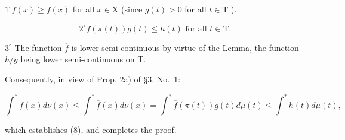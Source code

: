 \(1^{\circ}\overline{f} (x)\geqslant f(x)\) for all \(x\in \mathrm{X}\) (since \(g(t) > 0\) for all \(t\in \mathrm{T}\) ).

\[
2 ^ {\circ} \overline {{f}} (\pi (t)) g (t) \leqslant h (t) \text {   for   all   } t \in \mathrm{T}.
\]

\(3^{\circ}\) The function \(\overline{f}\) is lower semi-continuous by virtue of the Lemma, the function \(h / g\) being lower semi-continuous on T.

Consequently, in view of Prop. 2a) of §3, No.~1:

\[
\int^ {*} f (x) d \nu (x) \leqslant \int^ {*} \overline {{{f}}} (x) d \nu (x) = \int^ {*} \overline {{{f}}} (\pi (t)) g (t) d \mu (t) \leqslant \int^ {*} h (t) d \mu (t),
\]

which establishes (8), and completes the proof.


